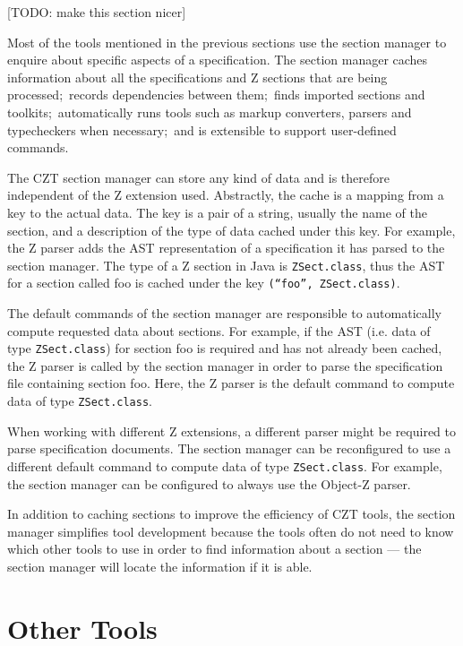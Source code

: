 \documentclass{llncs}
\newcommand{\Interface}[1]{\texttt{#1}}
\begin{document}
  [TODO: make this section nicer]

  Most of the tools mentioned in the previous sections use the section
  manager to enquire about specific aspects of a specification.  The
  section manager caches information about all the specifications and
  Z sections that are being processed;~records dependencies between
  them;~finds imported sections and toolkits;~automatically runs tools
  such as markup converters, parsers and typecheckers when necessary;~and
  is extensible to support user-defined commands.

  The CZT section manager can store any kind of data and is therefore
  independent of the Z extension used.  Abstractly, the cache is a
  mapping from a key to the actual data.  The key is a pair of a
  string, usually the name of the section, and a description of the
  type of data cached under this key.  For example, the Z parser adds
  the AST representation of a specification it has parsed to the
  section manager.  The type of a Z section in Java is
  \Interface{ZSect.class}, thus the AST for a section called foo is
  cached under the key \texttt{(``foo'',~ZSect.class)}.

  The default commands of the section manager are responsible to
  automatically compute requested data about sections. For example, if
  the AST (i.e. data of type \Interface{ZSect.class}) for section foo
  is required and has not already been cached, the Z parser is called
  by the section manager in order to parse the specification file
  containing section foo.  Here, the Z parser is the default command
  to compute data of type \Interface{ZSect.class}.

  When working with different Z extensions, a different
  parser might be required to parse specification documents.  The
  section manager can be reconfigured to use a different default
  command to compute data of type \Interface{ZSect.class}.  For
  example, the section manager can be configured to always use the
  Object-Z parser.

  In addition to caching sections to improve the efficiency of CZT
  tools, the section manager simplifies tool development because the
  tools often do not need to know which other tools to use in order to
  find information about a section --- the section manager will locate
  the information if it is able.

\section{Other Tools}
\label{other-tools}
\end{document}
